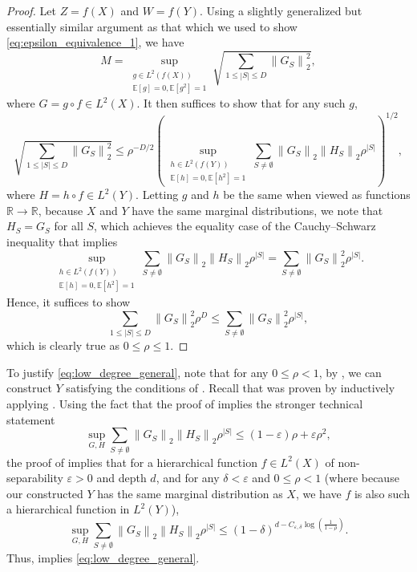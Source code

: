 \documentclass[12pt,letterpaper]{amsart}
\def\E{\mathbb{E}}
\def\R{\mathbb{R}}
\newcommand{\norm}[1]{\left\lVert#1\right\rVert}
\newcommand{\abs}[1]{\left\lvert#1\right\rvert}
\newcommand{\paren}[1]{\left(#1\right)}
\newcommand{\1}[1]{1_{\left\{#1\right\}}}
\theoremstyle{definition}
\theoremstyle{remark}
\begin{document}
\begin{proof}
    Let $Z=f(X)$ and $W=f(Y)$.
    Using a slightly generalized but essentially similar argument as that which we used to show \eqref{eq:epsilon_equivalence_1}, we have
    \[ M = \sup_{\substack{g\in L^2(f(X))\\\E[g]=0,\E[g^2]=1}}\sqrt{\sum_{1\leq\abs{S}\leq D}\norm{G_S}_2^2}, \]
    where $G=g\circ f\in L^2(X)$.
    It then suffices to show that for any such $g$,
    \[ \sqrt{\sum_{1\leq\abs{S}\leq D}\norm{G_S}_2^2} \leq \rho^{-D/2}\paren{\sup_{\substack{h\in L^2(f(Y))\\\E[h]=0,\E[h^2]=1}}\sum_{S\neq\emptyset}\norm{G_S}_2\norm{H_S}_2\rho^{\abs{S}}}^{1/2}, \]
    where $H=h\circ f \in L^2(Y)$.
    Letting $g$ and $h$ be the same when viewed as functions $\R\to\R$, because $X$ and $Y$ have the same marginal distributions, we note that $H_S=G_S$ for all $S$, which achieves the equality case of the Cauchy--Schwarz inequality that implies
    \[ \sup_{\substack{h\in L^2(f(Y))\\\E[h]=0,\E[h^2]=1}}\sum_{S\neq\emptyset}\norm{G_S}_2\norm{H_S}_2\rho^{\abs{S}} = \sum_{S\neq\emptyset}\norm{G_S}_2^2\rho^{\abs{S}}. \]
    Hence, it suffices to show
    \[ \sum_{1\leq\abs{S}\leq D}\norm{G_S}_2^2 \rho^{D} \leq \sum_{S\neq\emptyset}\norm{G_S}_2^2\rho^{\abs{S}}, \]
    which is clearly true as $0 \leq \rho \leq 1$.
\end{proof}
To justify \eqref{eq:low_degree_general}, note that for any $0 \leq \rho < 1$, by , we can construct $Y$ satisfying the conditions of .
Recall that  was proven by inductively applying .
Using the fact that the proof of  implies the stronger technical statement
\[ \sup_{G,H} \sum_{S\neq\emptyset}\norm{G_S}_2\norm{H_S}_2\rho^{\abs{S}} \leq (1-\varepsilon)\rho+\varepsilon\rho^2, \]
the proof of  implies that for a hierarchical function $f\in L^2(X)$ of non-separability $\varepsilon>0$ and depth $d$, and for any $\delta<\varepsilon$ and $0 \leq \rho < 1$ (where because our constructed $Y$ has the same marginal distribution as $X$, we have $f$ is also such a hierarchical function in $L^2(Y)$),
\[ \sup_{G,H} \sum_{S\neq\emptyset}\norm{G_S}_2\norm{H_S}_2\rho^{\abs{S}} \leq (1-\delta)^{d-C_{\varepsilon,\delta}\log\paren{\frac{1}{1-\rho}}}. \]
Thus,  implies \eqref{eq:low_degree_general}.
\end{document}
